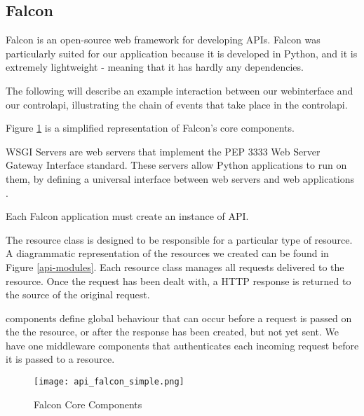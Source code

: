 \subsection{Falcon}

Falcon is an open-source web framework for developing \glspl{API}. Falcon was particularly suited for our application because it is developed in Python, and it is extremely lightweight - meaning that it has hardly any dependencies.

The following will describe an example interaction between our \gls{webinterface} and our \gls{controlapi}, illustrating the chain of events that take place in the \gls{controlapi}.

Figure \ref{fig:api-falcon-simple} is a simplified representation of Falcon's core components. 

\begin{description}
\item{WSGI Servers} are web servers that implement the PEP 3333 Web Server Gateway Interface standard. These servers allow Python applications to run on them, by defining a universal interface between web servers and web applications \cite{pep-3333}.

\item [Application] Each Falcon application must create an instance of API. 

\item [Resource] The resource class is designed to be responsible for a particular type of resource. A diagrammatic representation of the resources we created can be found in Figure \ref{api-modules}. Each resource class manages all requests delivered to the resource. Once the request has been dealt with, a HTTP response is returned to the source of the original request.

\item [Middleware] components define global behaviour that can occur before a request is passed on the the resource, or after the response has been created, but not yet sent. We have one middleware components that authenticates each incoming request before it is passed to a resource.
\end{description}

\begin{figure}[!htb]
\begin{center}
\texttt{[image: api\_falcon\_simple.png]}
\end{center}
\caption{Falcon Core Components}
\label{fig:api-falcon-simple}
\end{figure}




